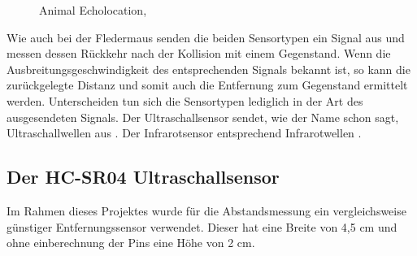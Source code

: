 \begin{figure}[H]
	\centering
	\caption[Ultraschallwellen einer Fledermaus]{Animal Echolocation, \protect{}} \label{fig:withSource} %
\end{figure}

Wie auch bei der Fledermaus senden die beiden Sensortypen ein Signal aus und messen dessen Rückkehr nach der Kollision mit einem Gegenstand. Wenn die Ausbreitungsgeschwindigkeit des entsprechenden Signals bekannt ist, so kann die zurückgelegte Distanz und somit auch die Entfernung zum Gegenstand ermittelt werden. Unterscheiden tun sich die Sensortypen lediglich in der Art des ausgesendeten Signals. Der Ultraschallsensor sendet, wie der Name schon sagt, Ultraschallwellen aus \protect{}. Der Infrarotsensor entsprechend Infrarotwellen \protect{}.


\subsection{Der HC-SR04 Ultraschallsensor}
Im Rahmen dieses Projektes wurde für die Abstandsmessung ein vergleichsweise günstiger Entfernungssensor verwendet. Dieser hat eine Breite von 4,5 cm und ohne einberechnung der Pins eine Höhe von 2 cm.

